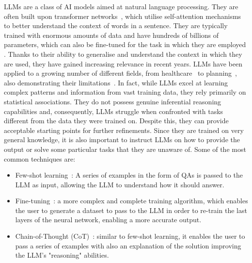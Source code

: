 LLMs are a class of AI models aimed at natural language processing. 
%
They are often built upon transformer networks~\cite{Transformer}, which utilise self-attention mechanisms to better understand the context of words in a sentence.
%
They are typically trained with enormous amounts of data and have hundreds of billions of parameters, which can also be fine-tuned for the task in which they are employed \cite{LLMsSurvey1, LLMsSurvey2}.
%
Thanks to their ability to generalise and understand the context in which they are used, they have gained increasing relevance in recent years.
%
LLMs have been applied to a growing number of different fields, from healthcare~\cite{LLMsHealthCare} to planning~\cite{LLMsSucc}, also demonstrating their limitations~\cite{LLMsCannotPlan}.
%
In fact, while LLMs excel at learning complex patterns and information from vast training data, they rely primarily on statistical associations. They do not possess genuine inferential reasoning capabilities and, consequently, LLMs struggle when confronted with tasks different from the data they were trained on. Despite this, they can provide acceptable starting points for further refinements.
% 
Since they are trained on very general knowledge, it is also important to instruct LLMs on how to provide the output or solve some particular tasks that they are unaware of. Some of the most common techniques are:
\begin{itemize}
    \item Few-shot learning~\cite{llmfewshotlearn}: A series of examples in the form of QAs is passed to the LLM as input, allowing the LLM to understand how it should answer. 
    \item Fine-tuning~\cite{llmfinetune}: a more complex and complete training algorithm, which enables the user to generate a dataset to pass to the LLM in order to re-train the last layers of the neural network, enabling a more accurate output.
    \item Chain-of-Thought (CoT)~\cite{wei2022chain}: similar to few-shot learning, it enables the user to pass a series of examples with also an explanation of the solution improving the LLM's "reasoning" abilities.
\end{itemize} 
